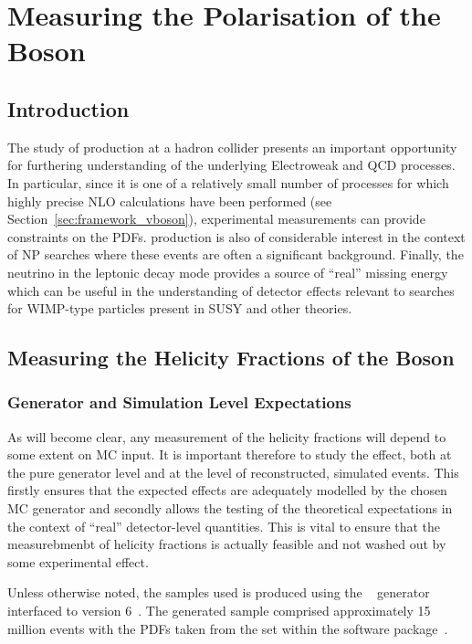 \chapter{Measuring the Polarisation of the \texorpdfstring{\PW}{W} Boson}
\label{sec:wpol}
\section{Introduction}
The study of \Wjets production at a hadron collider presents an important
opportunity for furthering understanding of the underlying Electroweak and
\ac{QCD} processes. In particular, since it is one of a relatively small number
of processes for which highly precise \ac{NLO} calculations have been performed
(see Section~\ref{sec:framework_vboson}), experimental measurements can provide
constraints on the \acp{PDF}. \Wjets production is also of considerable interest
in the context of \ac{NP} searches where these events are often a significant
background. Finally, the neutrino in the leptonic decay mode provides a source
of ``real'' missing energy which can be useful in the understanding of detector
effects relevant to searches for \acs{WIMP}-type particles present in \ac{SUSY}
and other theories.

\section{Measuring the Helicity Fractions of the \texorpdfstring{\PW}{W} Boson}
\subsection{Generator and Simulation Level Expectations}
As will become clear, any measurement of the helicity fractions will depend to
some extent on \acl{MC} input. It is important therefore to study the effect,
both at the pure generator level and at the level of reconstructed, simulated
events. This firstly ensures that the expected effects are adequately modelled
by the chosen \ac{MC} generator and secondly allows the testing of the
theoretical expectations in the context of ``real'' detector-level
quantities. This is vital to ensure that the measurebmenbt of helicity fractions
is actually feasible and not washed out by some experimental effect.

Unless otherwise noted, the \Wjets samples used is produced using the
\madgraph~\cite{madgraph} generator interfaced to \pythia version
6~\cite{pythia}. The generated sample comprised approximately 15 million events
with the \acp{PDF} taken from the \cteqsixlone set within the \lhapdf software
package~\cite{lhapdf, lhapdf_web}.


